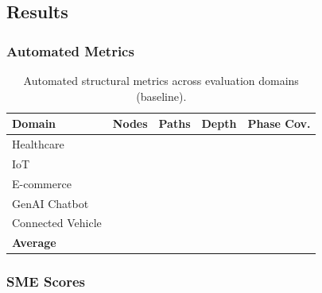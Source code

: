 \subsection{Results}


\subsubsection{Automated Metrics}

\begin{table}[t]
\centering
\caption{Automated structural metrics across evaluation domains (baseline).}
\label{tab:baseline-structural}
\begin{tabular}{@{}lrrrr@{}}
\toprule
\textbf{Domain} & \textbf{Nodes} & \textbf{Paths} & \textbf{Depth} & \textbf{Phase Cov.} \\
\midrule
Healthcare & \todo{} & \todo{} & \todo{} & \todo{} \\
IoT & \todo{} & \todo{} & \todo{} & \todo{} \\
E-commerce & \todo{} & \todo{} & \todo{} & \todo{} \\
GenAI Chatbot & \todo{} & \todo{} & \todo{} & \todo{} \\
Connected Vehicle & \todo{} & \todo{} & \todo{} & \todo{} \\
\midrule
\textbf{Average} & \todo{} & \todo{} & \todo{} & \todo{} \\
\bottomrule
\end{tabular}
\end{table}

\subsubsection{SME Scores}


